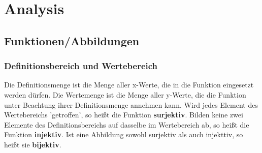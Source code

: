 \documentclass[letterpaper, titlepage]{article}
\begin{document}
\vspace{0.35cm}


\section{Analysis}\label{Analysis}


\subsection{Funktionen/Abbildungen}\label{Funktionen/Abbildungen}

\subsubsection{Definitionsbereich und Wertebereich}\label{Definitionsbereich und Wertebereich}
Die Definitionsmenge ist die Menge aller x-Werte, die in die Funktion eingesetzt werden dürfen. Die Wertemenge ist die Menge aller y-Werte, die die Funktion unter Beachtung ihrer Definitionsmenge annehmen kann. Wird jedes Element des Wertebereichs 'getroffen', so heißt die Funktion \textbf{surjektiv}. Bilden keine zwei Elemente des Definitionsbereichs auf dasselbe im Wertebereich ab, so heißt die Funktion \textbf{injektiv}. Ist eine Abbildung sowohl surjektiv als auch injekttiv, so heißt sie \textbf{bijektiv}.
\end{document}
